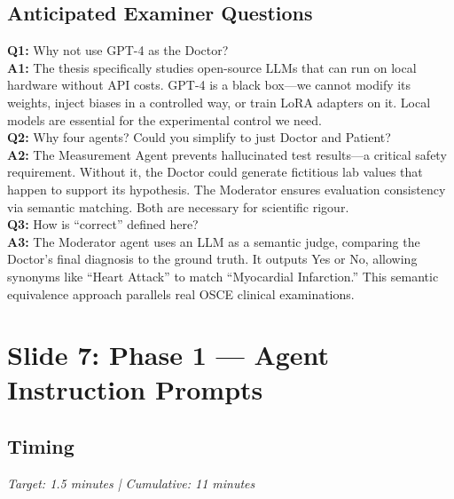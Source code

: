 \documentclass[12pt]{article}
\begin{document}
  \subsection*{Anticipated Examiner Questions}
  \begin{qabox}
  \textbf{Q1:} Why not use GPT-4 as the Doctor? \\
  \textbf{A1:} The thesis specifically studies open-source LLMs that can run on local hardware without API costs. GPT-4 is a black box---we cannot modify its weights, inject biases in a controlled way, or train LoRA adapters on it. Local models are essential for the experimental control we need. \\[6pt]
  \textbf{Q2:} Why four agents? Could you simplify to just Doctor and Patient? \\
  \textbf{A2:} The Measurement Agent prevents hallucinated test results---a critical safety requirement. Without it, the Doctor could generate fictitious lab values that happen to support its hypothesis. The Moderator ensures evaluation consistency via semantic matching. Both are necessary for scientific rigour. \\[6pt]
  \textbf{Q3:} How is ``correct'' defined here? \\
  \textbf{A3:} The Moderator agent uses an LLM as a semantic judge, comparing the Doctor's final diagnosis to the ground truth. It outputs Yes or No, allowing synonyms like ``Heart Attack'' to match ``Myocardial Infarction.'' This semantic equivalence approach parallels real OSCE clinical examinations.
  \end{qabox}



  \section{Slide 7: Phase 1 --- Agent Instruction Prompts}

  \subsection*{Timing}
  \textit{Target: 1.5 minutes | Cumulative: 11 minutes}
\end{document}
